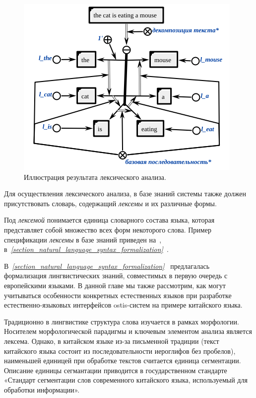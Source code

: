 \begin{figure}[h]
    \centering
    \includegraphics[scale=0.8]{images/part4/chapter_nl_interfaces/lexical}
    \caption{Иллюстрация результата лексического анализа.}
    \label{fig:lexical_result}
\end{figure}

Для осуществления лексического анализа, в базе знаний системы также должен присутствовать словарь, содержащий \textit{лексемы} и их различные формы.

Под \textit{лексемой} понимается единица словарного состава языка, которая представляет собой множество всех форм некоторого слова.
Пример спецификации \textit{лексемы} в базе знаний приведен на~\textit{}, в~\textit{\ref{section_natural_language_syntax_formalization}~}.

В~\textit{\ref{section_natural_language_syntax_formalization}~} предлагалась формализация лингвистических знаний, совместимых в первую очередь с европейскими языками.
В данной главе мы также рассмотрим, как могут учитываться особенности конкретных естественных языков при разработке естественно-языковых интерфейсов ostis-систем на примере китайского языка.

Традиционно в лингвистике структура слова изучается в рамках морфологии.
Носителем морфологической парадигмы и ключевым элементом анализа является лексема.
Однако, в китайском языке из-за письменной традиции (текст китайского языка состоит из последовательности иероглифов без пробелов), наименьшей единицей при обработке текстов считается единица сегментации.
Описание единицы сегмантации приводится в государственном стандарте «Стандарт сегментации слов современного китайского языка, используемый для обработки информации».
\begin{SCn}
\end{SCn}

